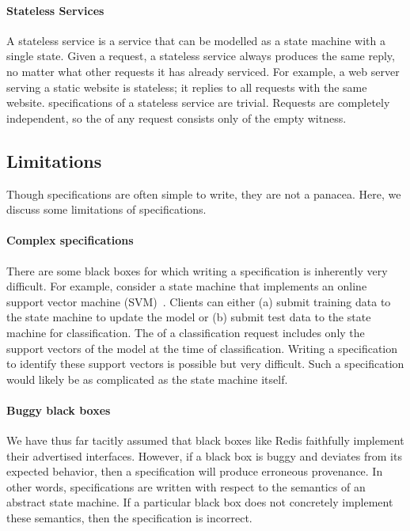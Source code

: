 \paragraph{Stateless Services}
A stateless service is a service that can be modelled as a state machine with a
single state. Given a request, a stateless service always produces the same
reply, no matter what other requests it has already serviced.  For example, a
web server serving a static website is stateless; it replies to all requests
with the same website. \Watprovenance{} specifications of a stateless service
are trivial. Requests are completely independent, so the \watprovenance{} of
any request consists only of the empty witness.

\subsection{Limitations}
Though \watprovenance{} specifications are often simple to write, they are not
a panacea. Here, we discuss some limitations of \watprovenance{}
specifications.

\paragraph{Complex \watprovenance{} specifications}
There are some black boxes for which writing a \watprovenance{} specification
is inherently very difficult. For example, consider a state machine that
implements an online support vector machine (SVM)~\cite{hearst1998support,
laskov2006incremental, bordes12huller}. Clients can either (a) submit training
data to the state machine to update the model or (b) submit test data to the
state machine for classification. The \watprovenance{} of a classification
request includes only the support vectors of the model at the time of
classification. Writing a \watprovenance{} specification to identify these
support vectors is possible but very difficult. Such a \watprovenance{}
specification would likely be as complicated as the state machine itself.

\paragraph{Buggy black boxes}
We have thus far tacitly assumed that black boxes like Redis faithfully
implement their advertised interfaces. However, if a black box is buggy and
deviates from its expected behavior, then a \watprovenance{} specification will
produce erroneous provenance. In other words, \watprovenance{} specifications
are written with respect to the semantics of an abstract state machine. If a
particular black box does not concretely implement these semantics, then the
\watprovenance{} specification is incorrect.
